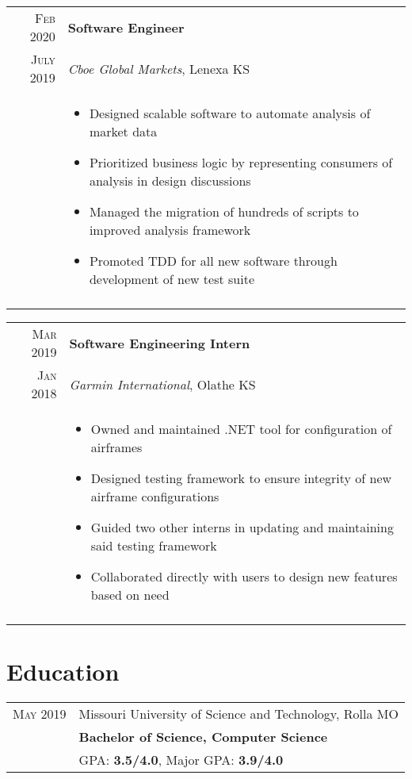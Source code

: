 \documentclass[a4paper,10pt]{article}
\newcommand{\br}{\\\multicolumn{2}{c}{}}
\begin{document}
\begin{tabular}{r|p{15cm}}
    \textsc{Feb 2020}   & \textbf{Software Engineer} \\
    \textsc{July 2019}  & \textit{Cboe Global Markets}, Lenexa KS \\ &
    \begin{itemize}
    \item Designed scalable software to automate analysis of market data
    \item Prioritized business logic by representing consumers of analysis in design discussions
    \item Managed the migration of hundreds of scripts to improved analysis framework
    \item Promoted TDD for all new software through development of new test suite

    \end{itemize} \br\\

\end{tabular}

\begin{tabular}{r|p{15cm}}
    \textsc{Mar 2019} & \textbf{Software Engineering Intern} \\
    \textsc{Jan 2018} & \textit{Garmin International}, Olathe KS \\ &
    \begin{itemize}
    \item Owned and maintained .NET tool for configuration of airframes
    \item Designed testing framework to ensure integrity of new airframe configurations
    \item Guided two other interns in updating and maintaining said testing framework
    \item Collaborated directly with users to design new features based on need
    \end{itemize} \br\\

\end{tabular}

\section{Education}
\begin{tabular}{r|p{15cm}}
    \textsc{May} 2019 & Missouri University of Science and Technology, Rolla MO  \\
                      & \textbf{Bachelor of Science, Computer Science} \\
                      & GPA: \textbf{3.5/4.0}, Major GPA: \textbf{3.9/4.0} \\
\end{tabular} \b\\
\end{document}
